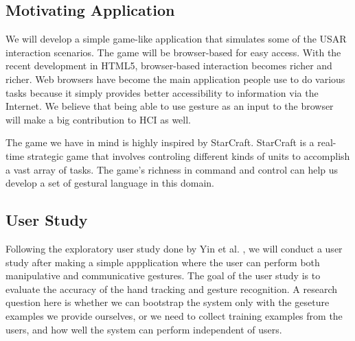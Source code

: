 \subsection{Motivating Application}
We will develop a simple game-like application that simulates some of the USAR
interaction scenarios. The game will be browser-based for easy access. With the
recent development in HTML5, browser-based interaction becomes richer and
richer. Web browsers have become the main application people use to do various
tasks because it simply provides better accessibility to information via the
Internet. We believe that being able to use gesture as an input to the browser
will make a big contribution to HCI as well.

The game we have in mind is highly inspired by StarCraft. StarCraft is a
real-time strategic game that involves controling different kinds of units to
accomplish a vast array of tasks. The game's richness in command
and control can help us develop a set of gestural language in this domain.

% 

\subsection{User Study}\label{sec:userStudy}
Following the exploratory user study done by Yin et al. \cite{yin10}, we will
conduct a user study after making a simple appplication where the user can
perform both manipulative and communicative gestures. The goal of the user study
is to evaluate the accuracy of the hand tracking and gesture recognition. A
research question here is whether we can bootstrap the system only with the
geseture examples we provide ourselves, or we need to collect training examples
from the users, and how well the system can perform independent of users.

